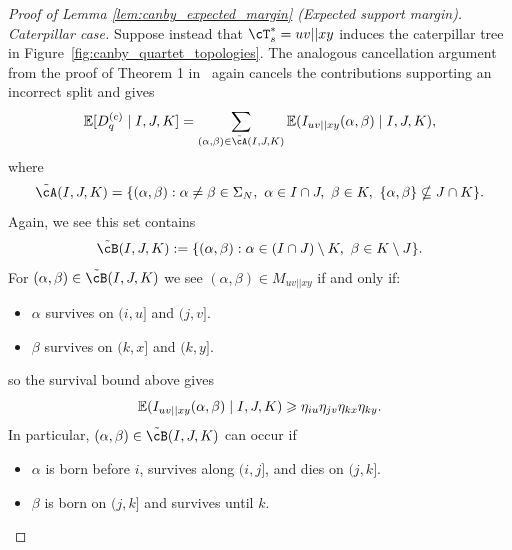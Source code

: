 \begin{proof}[Proof of Lemma \ref{lem:canby_expected_margin} (Expected support margin)]
\noindent\emph{Caterpillar case.}
Suppose instead that $\cT_s^*=uv||xy$ induces the caterpillar tree in
Figure~\ref{fig:canby_quartet_topologies}. The analogous cancellation argument from the proof of
Theorem 1 in~\cite{evans2026_canby_identifiability} again cancels the contributions
supporting an incorrect split and gives
%
\[\E [D_q^{(c)} \mid I, J, K] = \sum_{(\alpha, \beta) \in \tilde{\cA}(I, J, K)} \E(I_{uv||xy}(\alpha, \beta) \mid I, J, K),\]
%
\noindent where
\[\tilde{\cA}(I, J, K) = \{(\alpha, \beta) : \alpha\neq\beta \in \Sigma_N,\ \alpha \in I \cap J,\ \beta \in K,\ \{\alpha, \beta\} \nsubseteq J \cap K\}.\]
%
\noindent Again, we see this set contains
%
\[\tilde{\cB}(I, J, K) := \{(\alpha, \beta) : \alpha \in (I \cap J) \setminus K,\ \beta \in K \setminus J\}.\]
%
For $(\alpha, \beta) \in \tilde{\cB}(I, J, K)$ we see $(\alpha,\beta) \in M_{uv||xy}$ if and only if:

\begin{itemize}
    \item $\alpha$ survives on $(i, u]$ and $(j, v]$.
    \item $\beta$ survives on $(k,x]$ and $(k,y]$.
\end{itemize}

\noindent so the survival bound above gives
%
\[\mathbb{E}(I_{uv||xy}(\alpha, \beta) \mid I, J, K) \geqslant \eta_{iu}\eta_{jv} \eta_{kx} \eta_{ky}.\]
%
\noindent In particular, $(\alpha, \beta) \in \tilde{\cB}(I,J,K)$ can occur if
%
\begin{itemize}
    \item $\alpha$ is born before $i$, survives along $(i,j]$, and dies on $(j,k]$.
    \item $\beta$ is born on $(j,k]$ and survives until $k$.
\end{itemize}


\end{proof}
